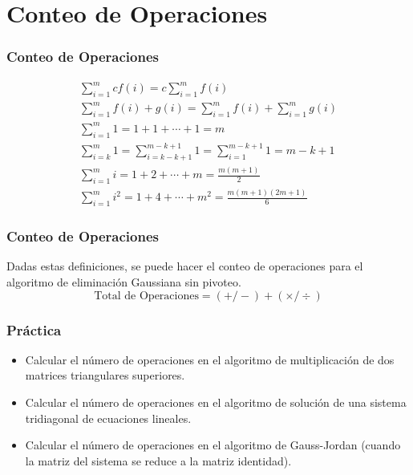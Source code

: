 \documentclass{beamer}
\begin{document}
\section{Conteo de Operaciones}
\begin{frame}
  \frametitle{Conteo de Operaciones}
\begin{block}{}
  $$
  \begin{array}{l}
    \displaystyle\sum_{i=1}^mcf(i) = c\sum_{i=1}^mf(i) \\
    \displaystyle\sum_{i=1}^mf(i)+g(i)=\sum_{i=1}^mf(i)+\sum_{i=1}^mg(i)\\
    \displaystyle\sum_{i=1}^m1=1+1+\cdots+1=m \\ \displaystyle\sum_{i=k}^m1=\sum_{i=k-k+1}^{m-k+1}1=\sum_{i=1}^{m-k+1}1=m-k+1\\
    \displaystyle\sum_{i=1}^mi=1+2+\cdots+m=\frac{m(m+1)}{2} \\
    \displaystyle\sum_{i=1}^mi^2=1+4+\cdots+m^2=\frac{m(m+1)(2m+1)}{6}
    \end{array}
    $$
\end{block}  
\end{frame}
\begin{frame}
  \frametitle{Conteo de Operaciones}
  Dadas estas definiciones, se puede hacer el conteo de operaciones para el algoritmo de eliminaci\'on Gaussiana sin pivoteo.
  $$
  \text{Total de Operaciones} = (+/-) + (\times/\div)
  $$
\end{frame}
\begin{frame}
  \frametitle{Pr\'actica}
  \begin{itemize}
   \item Calcular el n\'umero de operaciones en el algoritmo de multiplicaci\'on de dos matrices triangulares superiores.
   \item Calcular el n\'umero de operaciones en el algoritmo de soluci\'on de una sistema tridiagonal de ecuaciones lineales.
   \item Calcular el n\'umero de operaciones en el algoritmo de Gauss-Jordan (cuando la matriz del sistema se reduce a la matriz identidad).
  \end{itemize}
\end{frame}
\end{document}
